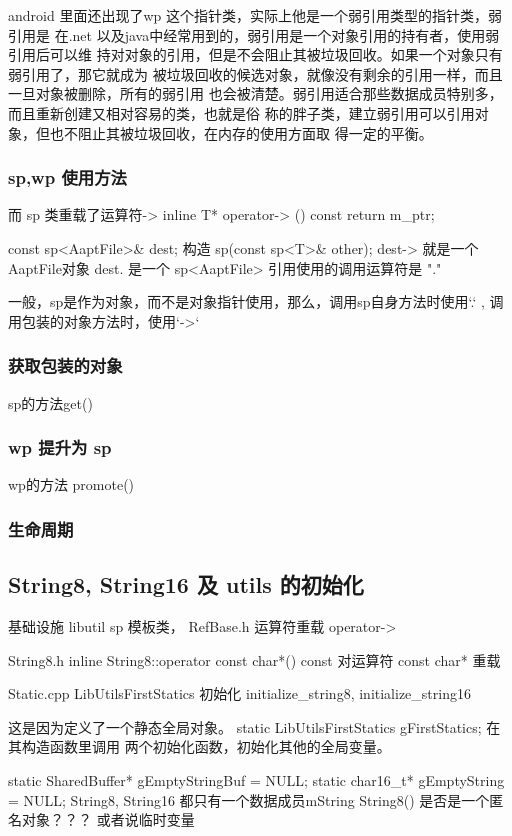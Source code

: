 \documentclass[a4paper,11pt]{article}
\begin{document}
android 里面还出现了wp 这个指针类，实际上他是一个弱引用类型的指针类，弱引用是
在.net 以及java中经常用到的，弱引用是一个对象引用的持有者，使用弱引用后可以维
持对对象的引用，但是不会阻止其被垃圾回收。如果一个对象只有弱引用了，那它就成为
被垃圾回收的候选对象，就像没有剩余的引用一样，而且一旦对象被删除，所有的弱引用
也会被清楚。弱引用适合那些数据成员特别多，而且重新创建又相对容易的类，也就是俗
称的胖子类，建立弱引用可以引用对象，但也不阻止其被垃圾回收，在内存的使用方面取
得一定的平衡。

\subsubsection{sp,wp 使用方法}
而 sp 类重载了运算符-> 
    inline  T*      operator-> () const { return m_ptr;  }

const sp<AaptFile>\& dest;  构造   sp(const sp<T>\& other);
dest-> 就是一个AaptFile对象
dest.  是一个 sp<AaptFile>
引用使用的调用运算符是 "."

一般，sp是作为对象，而不是对象指针使用，那么，调用sp自身方法时使用`.` ,
调用包装的对象方法时，使用`->`

\subsubsection{获取包装的对象} 
sp的方法get()

\subsubsection{wp 提升为 sp}
wp的方法 promote()
\subsubsection{生命周期}


\subsection{ String8, String16 及 utils 的初始化 }
基础设施 libutil 
sp 模板类， RefBase.h    运算符重载 operator->

String8.h 
inline String8::operator const char*() const  
对运算符 const char* 重载

Static.cpp  LibUtilsFirstStatics   初始化 initialize_string8,
initialize_string16 

这是因为定义了一个静态全局对象。
static LibUtilsFirstStatics gFirstStatics;
在其构造函数里调用 两个初始化函数，初始化其他的全局变量。 

static SharedBuffer* gEmptyStringBuf = NULL;
static char16_t* gEmptyString = NULL;
String8, String16 都只有一个数据成员mString
String8() 是否是一个匿名对象？？？  或者说临时变量
\end{document}
